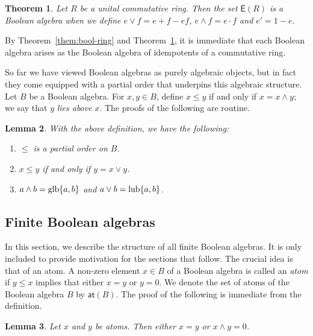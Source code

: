 \documentclass[a4paper]{amsart}
\newtheorem{theorem}{Theorem}[section]
\newtheorem{lemma}[theorem]{Lemma}
\begin{document}
\begin{theorem}\label{them:foster} Let $R$ be a unital commutative ring.
Then the set $\mathsf{E}(R)$ is a Boolean algebra when we define $e \vee f = e + f - ef$, $e \wedge f = e \cdot f$
and $e' = 1 - e$.
\end{theorem}

By Theorem~\ref{them:bool-ring} and Theorem~\ref{them:foster}, it is immediate that each Boolean algebra
arises as the Boolean algebra of idempotents of a commutative ring.

So far we have viewed Boolean algebras as purely algebraic objects,
but in fact they come equipped with a partial order that underpins this algebraic structure. 
Let $B$ be a Boolean algebra.
For $x,y \in B$, define $x \leq y$ if and only if $x = x \wedge y$;
we say that $y$ {\em lies above} $x$.
The proofs of the following are routine.

\begin{lemma}\label{lem:order} With the above definition, we have the following:
\begin{enumerate}
\item $\leq$ is a partial order on $B$.

\item $x \leq y$ if and only if $y = x \vee y$.

\item $a \wedge b = \mbox{\rm glb}\{a,b\}$  and $a \vee b = \mbox{\rm lub}\{a,b\}$.

\end{enumerate}
\end{lemma}



\subsection{Finite Boolean algebras}

In this section, we describe the structure of all finite Boolean algebras.
It is only included to provide motivation for the sections that follow.
The crucial idea is that of an atom.
A non-zero element $x \in B$ of a Boolean algebra is called an {\em atom} if $y \leq x$ implies that either $x = y$ or $y = 0$.
We denote the set of atoms of the Boolean algebra $B$ by $\mathsf{at}(B)$.  
The proof of the following is immediate from the definition.

\begin{lemma}\label{lem:jojo} 
Let $x$ and $y$ be atoms. Then either $x = y$ or $x \wedge y = 0$.
\end{lemma}
\end{document}
